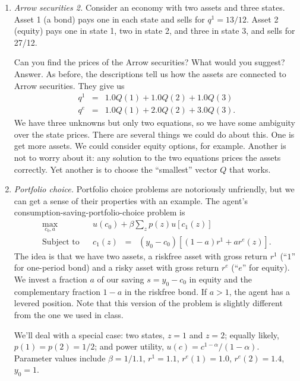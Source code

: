 \documentclass[11pt]{article}
\begin{document}
\begin{enumerate}
\item {\it Arrow securities 2.\/}
Consider an economy with two assets and three states.
Asset 1 (a bond) pays one in each state and sells for $q^1 = 13/12$.
Asset 2 (equity) pays one in state 1, two in state 2, and three in state 3,
and sells for 27/12.

Can you find the prices of the Arrow securities?
What would you suggest?
%
Answer.
As before, the descriptions tell us how the assets are connected to Arrow securities.
They give us
\begin{eqnarray*}
    q^1 &=& 1.0 Q(1) + 1.0 Q(2) + 1.0 Q(3) \\
    q^e &=& 1.0 Q(1) + 2.0 Q(2) + 3.0 Q(3) .
\end{eqnarray*}
We have three unknowns but only two equations, so we have some ambiguity over
the state prices.
There are several things we could do about this.
One is get more assets.  We could consider equity options, for example.
Another is not to worry about it:  any solution to the two equations prices
the assets correctly.
Yet another is to choose the ``smallest'' vector $Q$ that works.

\item {\it Portfolio choice.\/}
Portfolio choice problems are notoriously unfriendly,
but we can get a sense of their properties with an example.
The agent's consumption-saving-portfolio-choice problem is
\begin{eqnarray*}
   \max_{c_0, a} &&  u(c_0) + \beta \sum_z p(z) u[c_1(z)] \\
   \mbox{Subject to} &&  c_1(z)\;\;=\;\; (y_0-c_0)[(1-a) r^1 + a r^e(z)] .
\end{eqnarray*}
The idea is that we have two assets,
a riskfree asset with gross return $r^1$ (``$1$'' for one-period bond)
and a risky asset with gross return $r^e$  (``$e$'' for equity).
We invest a fraction $a$ of our saving $s = y_0 - c_0$
in equity and the complementary
fraction $1-a$ in the riskfree bond.
If $a>1$, the agent has a levered position.
Note that this version of the problem is slightly different from the one we used in class.

We'll deal with a special case:
two states, $z=1$ and $z=2$;
equally likely, $p(1) = p(2) = 1/2$;
and power utility, $u(c) = c^{1-\alpha}/(1-\alpha)$.
Parameter values include
$\beta = 1/1.1$,
$r^1 = 1.1$,
$r^e(1) = 1.0$, $r^e(2) = 1.4$,
$ y_0 = 1$.


\end{enumerate}
\end{document}
